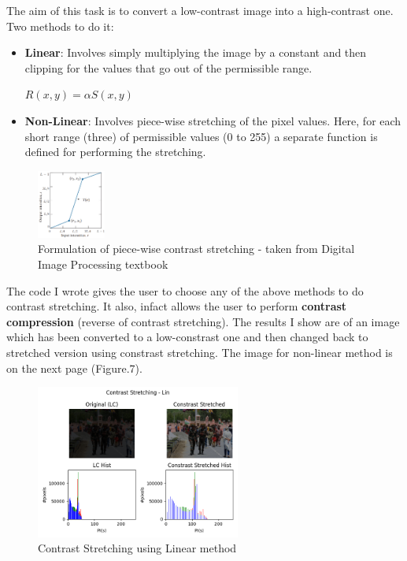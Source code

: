 \documentclass[notitlepage]{report}
\begin{document}
The aim of this task is to convert a low-contrast image into a high-contrast one. Two methods to do it:
\begin{itemize}
    \item \textbf{Linear}: Involves simply multiplying the image by a constant and then clipping for the values that go out of the 
    permissible range.
    \begin{center}
        $R(x, y) = \alpha S(x, y)$
    \end{center}
    \item \textbf{Non-Linear}: Involves piece-wise stretching of the pixel values. Here, for each short range (three) of 
    permissible values (0 to 255) a separate function is defined for performing the stretching.
\end{itemize}
\newpage

\begin{figure}[htp]
    \centering
    \hypertarget{CStretch_ref}{\includegraphics[width = 0.2\textwidth]{CStretch_ref.png}}
    \caption{Formulation of piece-wise contrast stretching - taken from Digital Image Processing textbook}
    \label{fig5:sysfig}
\end{figure}

The code I wrote gives the user to choose any of the above methods to do contrast stretching. It also, infact allows the user
to perform \textbf{contrast compression} (reverse of contrast stretching). The results I show are of an image which has been 
converted to a low-constrast one and then changed back to stretched version using constrast stretching. The image for non-linear
method is on the next page (Figure.7).

\begin{figure}[htp]
    \centering
    \hypertarget{CStretch_Lin}{\includegraphics[width = 0.6\textwidth]{CStretch_L.png}}
    \caption{Contrast Stretching using Linear method}
    \label{fig6:sysfig}
\end{figure}
\end{document}
